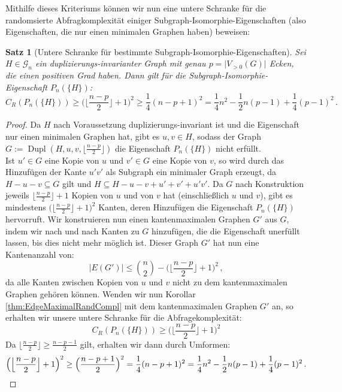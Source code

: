 \documentclass[10pt,a4paper, footheight=1mm]{scrreprt}
\newtheorem{Satz}[definition]{Satz}
\theoremstyle{definition}
\DeclareMathOperator\Dupl{Dupl}
\begin{document}
Mithilfe dieses Kriteriums können wir nun eine
untere Schranke für die randomsierte Abfragkomplexität
einiger Subgraph-Isomorphie-Eigenschaften (also Eigenschaften,
die nur einen minimalen Graphen haben) beweisen:
\begin{Satz}
[Untere Schranke für bestimmte Subgraph-Isomorphie-Eigenschaften]
\label{thm:SubgraphIsomorphismLowerBound}
Sei $H\in \mathcal{G}_n$ ein duplizierungs-invarianter Graph
mit genau $p = \big|V_{>0}(G)\big|$ Ecken, die einen positiven Grad haben.
Dann gilt für die Subgraph-Isomorphie-Eigenschaft $P_n(\{H\})$:
$$ C_R(P_n(\{H\})) \geq 
\Big ( \Big \lfloor  \frac{n-p}{2} \Big \rfloor + 1 \Big)^{2} \geq
\frac{1}{4}(n-p+1)^2 =
\frac{1}{4}n^2 - \frac{1}{2}n(p-1) + \frac{1}{4}(p-1)^2\,.
$$
\end{Satz}
\begin{proof}
Da $H$ nach Voraussetzung duplizierungs-invariant ist und die 
Eigenschaft nur einen minimalen Graphen hat, gibt es
$u,v \in H$, sodass der Graph 
$G:= \Dupl(H, u, v, \big \lfloor \frac{n-p}{2} \big \rfloor)$
die Eigenschaft $P_n(\{H\})$ nicht erfüllt. \\
Ist $u'\in G$ eine Kopie von $u$ und $v' \in G$ eine Kopie von $v$,
so wird durch das Hinzufügen der Kante $u'v'$ als Subgraph ein
minimaler Graph erzeugt, da $H-u-v \subseteq G$ gilt und
$H \subseteq H-u-v + u' + v' + u'v'$. Da $G$ nach Konstruktion
jeweils $\big \lfloor \frac{n-p}{2} \big \rfloor+1$ Kopien von
$u$  und von $v$ hat (einschließlich $u$ und $v$), gibt es mindestens
$\Big( \Big \lfloor  \frac{n-p}{2} \Big \rfloor + 1 \Big)^{2}$
Kanten, deren Hinzufügen die Eigenschaft $P_n(\{H\})$ hervorruft.
Wir konstruieren nun einen kantenmaximalen Graphen $G'$ aus
$G$, indem wir nach und nach Kanten zu $G$ hinzufügen, die die
Eigenschaft unerfüllt lassen, bis dies nicht mehr möglich ist.
Dieser Graph $G'$ hat nun eine Kantenanzahl von:
$$ |E(G')| \leq \binom{n}{2} - 
\Big ( \Big \lfloor  \frac{n-p}{2} \Big \rfloor + 1 \Big)^{2}\,,$$
da alle Kanten zwischen Kopien von $u$ und $v$ nicht zu dem
kantenmaximalen Graphen gehören können. Wenden wir nun
Korollar \ref{thm:EdgeMaximalRandCompl} mit dem kantenmaximalen
Graphen $G'$ an, so erhalten wir unsere untere Schranke für
die Abfragekomplexität:
$$ C_R(P_n(\{H\})) \geq 
\Big (  \Big \lfloor  \frac{n-p}{2} \Big \rfloor + 1 \Big )^2$$
Da $\Big \lfloor  \frac{n-p}{2} \Big \rfloor \geq \frac{n-p-1}{2}$
gilt, erhalten wir dann durch Umformen:
\begin{equation*}
\Big ( \Big \lfloor  \frac{n-p}{2} \Big \rfloor + 1 \Big)^{2} \geq
\Big ( \frac{n-p+1}{2} \Big ) ^2 =
\frac{1}{4}(n-p+1)^2 =
\frac{1}{4}n^2 - \frac{1}{2}n(p-1) + \frac{1}{4}(p-1)^2\,. \qedhere
\end{equation*}
\end{proof}
\end{document}
